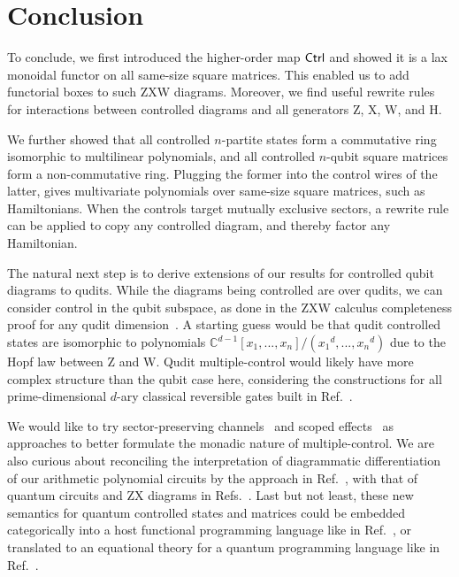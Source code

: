 \section{Conclusion}
To conclude, we first introduced the higher-order map $\textsf{Ctrl}$ and showed it is a lax monoidal functor on all same-size square matrices. This enabled us to add functorial boxes to such ZXW diagrams. Moreover, we find useful rewrite rules for interactions between controlled diagrams and all generators Z, X, W, and H.

We further showed that all controlled $n$-partite states form a commutative ring isomorphic to multilinear polynomials, and all controlled $n$-qubit square matrices form a non-commutative ring. Plugging the former into the control wires of the latter, gives multivariate polynomials over same-size square matrices, such as Hamiltonians. When the controls target mutually exclusive sectors, a rewrite rule can be applied to copy any controlled diagram, and thereby factor any Hamiltonian.

The natural next step is to derive extensions of our results for controlled qubit diagrams to qudits.
While the diagrams being controlled are over qudits, we can consider control in the qubit subspace, as done in the ZXW calculus completeness proof for any qudit dimension~\cite{poor2023completeness}.
A starting guess would be that qudit controlled states are isomorphic to polynomials $\mathbb{C}^{d-1}[x_1,...,x_n]/({x_1}^d,...,{x_n}^d)$ due to the Hopf law between Z and W.
Qudit multiple-control would likely have more complex structure than the qubit case here, considering the constructions for all prime-dimensional $d$-ary classical reversible gates built in Ref.~\cite{Roy2023quditzh}.

We would like to try sector-preserving channels~\cite{Vanrietvelde2021ctrlsector} and scoped effects~\cite{lindley2024scoped} as approaches to better formulate the monadic nature of multiple-control.
We are also curious about reconciling the interpretation of diagrammatic differentiation of our arithmetic polynomial circuits by the approach in Ref.~\cite{wilson2023diffpolycirc}, with that of quantum circuits and ZX diagrams in Refs.~\cite{toumi2021diagdiff, wang2022diffintzx, jeandel2024adddiffzx}.
Last but not least, these new semantics for quantum controlled states and matrices could be embedded categorically into a host functional programming language like in Ref.~\cite{rennela2020clctrllinlogic}, or translated to an equational theory for a quantum programming language like in Ref.~\cite{staton2015algqpl}.